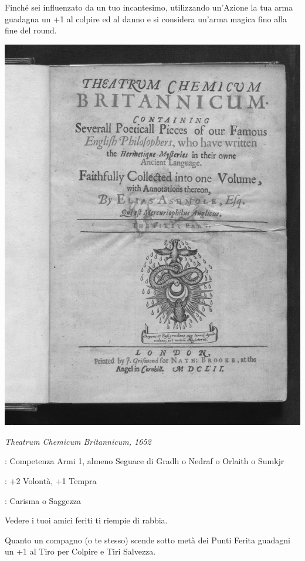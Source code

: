 \begin{multicols}{2}
Finché sei influenzato da un tuo incantesimo, utilizzando un'Azione la tua arma guadagna un +1 al colpire ed al danno e si considera un'arma magica fino alla fine del round.


\begin{center}

	\includegraphics[width=0.7\linewidth]{immagini/Theatrum_Chemicum_Britannicum.png}

	\emph{Theatrum Chemicum Britannicum, 1652}
\end{center}

\begin{description}[noitemsep, topsep=0pt, parsep=0pt, partopsep=0pt, leftmargin=0cm, labelwidth=2.5cm]
    \item[\textbf{Requisito}]: Competenza Armi 1, almeno Seguace di Gradh o Nedraf o Orlaith o Sumkjr
    \item[\textbf{Tiri Salvezza}]: +2 Volontà, +1 Tempra
    \item[\textbf{Caratteristica}]: Carisma o Saggezza
\end{description}

Vedere i tuoi amici feriti ti riempie di rabbia.

Quanto un compagno (o te stesso) scende sotto metà dei Punti Ferita guadagni un +1 al Tiro per Colpire e Tiri Salvezza.


\end{multicols}
